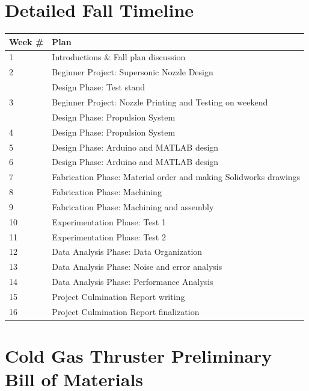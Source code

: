 \documentclass[conference]{IEEEtran} %
\begin{document}
\section{\textbf{Detailed Fall Timeline}}
\centering
\begin{tabular}{ |p{1.25cm}||p{11.0cm}| }
  \hline
  Week \# & Plan \\
  \hline
  1 & Introductions \& Fall plan discussion \\
  \hline
  2 & Beginner Project: Supersonic Nozzle Design  \\
  & Design Phase: Test stand \\
  \hline
  3 & Beginner Project: Nozzle Printing and Testing on weekend \\
  & Design Phase: Propulsion System \\
  \hline
  4 & Design Phase: Propulsion System \\
  \hline
  5 & Design Phase: Arduino and MATLAB design \\
  \hline
  6 & Design Phase: Arduino and MATLAB design \\
  \hline
  7 & Fabrication Phase: Material order and making Solidworks drawings\\
  \hline
  8 & Fabrication Phase: Machining \\
  \hline
  9 & Fabrication Phase: Machining and assembly \\
  \hline
  10 & Experimentation Phase: Test 1 \\
  \hline
  11 & Experimentation Phase: Test 2 \\
  \hline
  12 & Data Analysis Phase: Data Organization \\
  \hline
  13 & Data Analysis Phase: Noise and error analysis \\
  \hline
  14 & Data Analysis Phase: Performance Analysis \\
  \hline
  15 & Project Culmination Report writing \\
  \hline
  16 & Project Culmination Report finalization \\
  \hline
\end{tabular}

\newpage
\section{\textbf{Cold Gas Thruster Preliminary Bill of Materials}}
\end{document}
